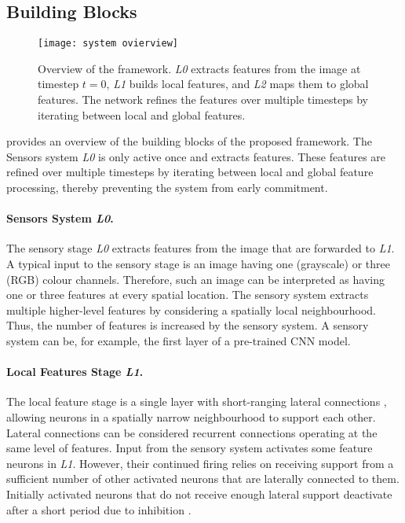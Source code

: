 \subsection{Building Blocks}
\begin{figure}[h]
    \centering
    \texttt{[image: system ovierview]}
    \caption[Overview of the framework]{Overview of the framework. \emph{L0} extracts features from the image at timestep $t=0$, \emph{L1} builds local features, and \emph{L2} maps them to global features. The network refines the features over multiple timesteps by iterating between local and global features.}
\end{figure}

 provides an overview of the building blocks of the proposed framework. The Sensors system \emph{L0} is only active once and extracts features. These features are refined over multiple timesteps by iterating between local and global feature processing, thereby preventing the system from early commitment.

\paragraph{Sensors System \emph{L0}.} The sensory stage \emph{L0} extracts features from the image that are forwarded to \emph{L1}.
A typical input to the sensory stage is an image having one (grayscale) or three (RGB) colour channels. Therefore, such an image can be interpreted as having one or three features at every spatial location.
The sensory system extracts multiple higher-level features by considering a spatially local neighbourhood. Thus, the number of features is increased by the sensory system.
A sensory system can be, for example, the first layer of a pre-trained CNN model.

\paragraph{Local Features Stage \emph{L1}.} The local feature stage is a single layer with short-ranging lateral connections , allowing neurons in a spatially narrow neighbourhood to support each other. Lateral connections can be considered recurrent connections operating at the same level of features. Input from the sensory system activates some feature neurons in \emph{L1}. However, their continued firing relies on receiving support from a sufficient number of other activated neurons that are laterally connected to them. Initially activated neurons that do not receive enough lateral support deactivate after a short period due to inhibition .

